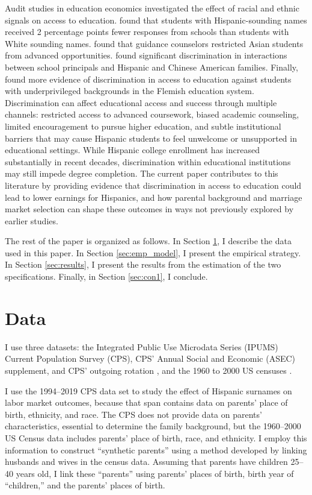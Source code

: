 Audit studies in education economics investigated the effect of racial and ethnic signals on access to education. \textcite{bergman2018education} found that students with Hispanic-sounding names received 2 percentage points fewer responses from schools than students with White sounding names. \textcite{janssen2022guidance} found that guidance counselors restricted Asian students from advanced opportunities. \textcite{gaddis2024racial} found significant discrimination in interactions between school principals and Hispanic and Chinese American families. Finally, \textcite{bourabain2023school} found more evidence of discrimination in access to education against students with underprivileged backgrounds in the Flemish education system. Discrimination can affect educational access and success through multiple channels: restricted access to advanced coursework, biased academic counseling, limited encouragement to pursue higher education, and subtle institutional barriers that may cause Hispanic students to feel unwelcome or unsupported in educational settings. While Hispanic college enrollment has increased substantially in recent decades, discrimination within educational institutions may still impede degree completion. The current paper contributes to this literature by providing evidence that discrimination in access to education could lead to lower earnings for Hispanics, and how parental background and marriage market selection can shape these outcomes in ways not previously explored by earlier studies.

The rest of the paper is organized as follows. In Section \ref{sec:data}, I describe the data used in this paper. In Section \ref{sec:emp_model}, I present the empirical strategy. In Section \ref{sec:results}, I present the results from the estimation of the two specifications. Finally, in Section \ref{sec:con1}, I conclude.

\section{Data}\label{sec:data}

I use three datasets:  the Integrated Public Use Microdata Series (IPUMS) Current Population Survey (CPS), CPS' Annual Social and Economic (ASEC) supplement, and CPS' outgoing rotation \autocite{cps2019}, and the 1960 to 2000 US censuses \autocite{acs2019}. 

I use the 1994–2019 CPS data set to study the effect of Hispanic surnames on labor market outcomes, because that span contains data on parents’ place of birth, ethnicity, and race. The CPS does not provide data on parents’ characteristics, essential to determine the family background, but the 1960–2000 US Census data includes parents’ place of birth, race, and ethnicity. I employ this information to construct ``synthetic parents'' using a method developed by \textcite{rubinstein2014pride} linking husbands and wives  in the census data. Assuming that parents have children 25–40 years old, I link these “parents” using parents’ places of birth, birth year of ``children,'' and the parents’ places of birth.

